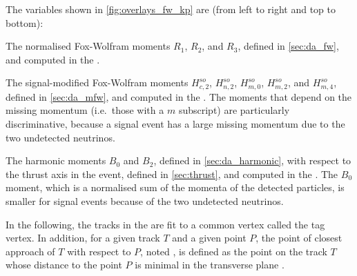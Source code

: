 The variables shown in \cref{fig:overlays_fw_kp} are (from left to right and top to bottom):
\bi
\item The normalised Fox-Wolfram moments $R_1$, $R_2$, and $R_3$, defined in \cref{sec:da_fw}, and computed in the \CMS.
\item The signal-\ROE modified Fox-Wolfram moments $H^{so}_{c,2}$, $H^{so}_{n,2}$, $H^{so}_{m,0}$, $H^{so}_{m,2}$, and $H^{so}_{m,4}$, defined in \cref{sec:da_mfw}, and computed in the \CMS.
The moments that depend on the missing momentum (i.e.~those with a $m$ subscript) are particularly discriminative, because a signal event has a large missing momentum due to the two undetected neutrinos.
\item The harmonic moments $B_0$ and $B_2$, defined in \cref{sec:da_harmonic}, with respect to the thrust axis in the event, defined in \cref{sec:thrust}, and computed in the \CMS.
The $B_0$ moment, which is a normalised sum of the momenta of the detected particles, is smaller for signal events because of the two undetected neutrinos.
\ei

In the following, the tracks in the \ROE are fit to a common vertex called the tag vertex.
In addition, for a given track $T$ and a given point $P$, the point of closest approach of $T$ with respect to $P$, noted \POCA, is defined as the point on the track $T$ whose distance to the point $P$ is minimal in the transverse plane \cite{Bertacchi2021}.

